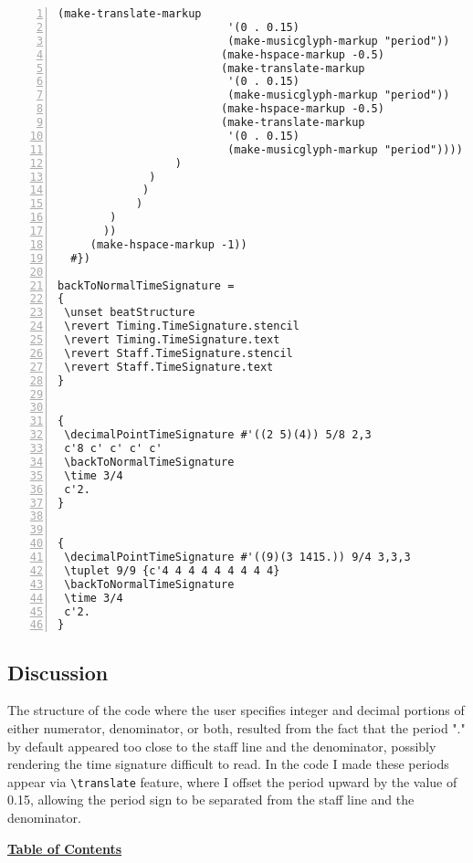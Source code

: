 \begin{Verbatim}[numbers=left,xleftmargin=5mm]
                         (make-translate-markup
                          '(0 . 0.15)
                          (make-musicglyph-markup "period"))
                         (make-hspace-markup -0.5)
                         (make-translate-markup
                          '(0 . 0.15)
                          (make-musicglyph-markup "period"))
                         (make-hspace-markup -0.5)
                         (make-translate-markup
                          '(0 . 0.15)
                          (make-musicglyph-markup "period"))))
                  )
              )
             )
            )
        )
       ))
     (make-hspace-markup -1))
  #})

backToNormalTimeSignature =
{
 \unset beatStructure
 \revert Timing.TimeSignature.stencil
 \revert Timing.TimeSignature.text
 \revert Staff.TimeSignature.stencil
 \revert Staff.TimeSignature.text
}


{
 \decimalPointTimeSignature #'((2 5)(4)) 5/8 2,3
 c'8 c' c' c' c'
 \backToNormalTimeSignature
 \time 3/4
 c'2.
}


{
 \decimalPointTimeSignature #'((9)(3 1415.)) 9/4 3,3,3
 \tuplet 9/9 {c'4 4 4 4 4 4 4 4 4}
 \backToNormalTimeSignature
 \time 3/4
 c'2.
}

\end{Verbatim}

\subsection{Discussion}
The structure of the code where the user specifies integer and decimal portions of either numerator, denominator, or both, resulted from the fact that the period "." by default appeared too close to the staff line and the denominator, possibly rendering the time signature difficult to read. In the code I made these periods appear via \verb|\translate| feature, where I offset the period upward by the value of 0.15, allowing the period sign to be separated  from the staff line and the denominator. 


\hyperref[sec:toc]{\textbf{Table of Contents}}

\vfill \break

